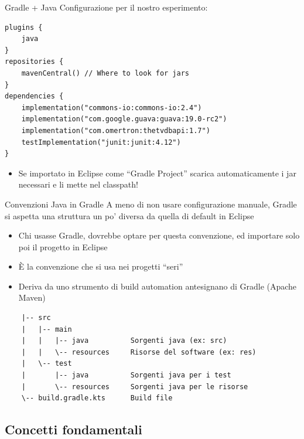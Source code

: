 \documentclass[presentation]{beamer}
\begin{document}
\begin{frame}[fragile]{Gradle + Java}
Configurazione per il nostro esperimento:
\begin{block}{}
\begin{verbatim}
plugins {
    java
}
repositories {
    mavenCentral() // Where to look for jars
}
dependencies {
    implementation("commons-io:commons-io:2.4")
    implementation("com.google.guava:guava:19.0-rc2")
    implementation("com.omertron:thetvdbapi:1.7")
    testImplementation("junit:junit:4.12")
}
\end{verbatim}
\end{block}
\begin{itemize}
    \item Se importato in Eclipse come ``Gradle Project'' scarica automaticamente i jar necessari e li mette nel classpath!
\end{itemize}
\end{frame}

\begin{frame}[fragile]{Convenzioni Java in Gradle}
    A meno di non usare configurazione manuale, Gradle si aspetta una struttura un po' diversa da quella di default in Eclipse
    \begin{itemize}
        \item Chi usasse Gradle, dovrebbe optare per questa convenzione, ed importare solo poi il progetto in Eclipse
        \item È la convenzione che si usa nei progetti ``seri''
        \item Deriva da uno strumento di build automation antesignano di Gradle (Apache Maven)
    \end{itemize}
    \begin{verbatim}
    |-- src
    |   |-- main
    |   |   |-- java          Sorgenti java (ex: src)
    |   |   \-- resources     Risorse del software (ex: res)
    |   \-- test
    |       |-- java          Sorgenti java per i test
    |       \-- resources     Sorgenti java per le risorse
    \-- build.gradle.kts      Build file
    \end{verbatim}
\end{frame}

\subsection{Concetti fondamentali}
\end{document}
